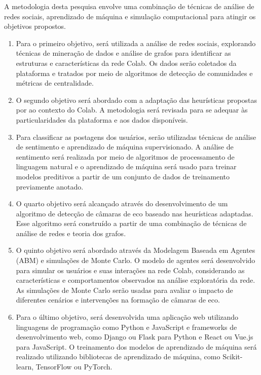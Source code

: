 A metodologia desta pesquisa envolve uma combinação de técnicas de análise de redes sociais, aprendizado de máquina e simulação computacional para atingir os objetivos propostos.

\begin{enumerate}
	\item Para o primeiro objetivo, será utilizada a análise de redes sociais, explorando técnicas de mineração de dados e análise de grafos para identificar as estruturas e características da rede Colab. Os dados serão coletados da plataforma e tratados por meio de algoritmos de detecção de comunidades e métricas de centralidade.
	\item O segundo objetivo será abordado com a adaptação das heurísticas propostas por  ao contexto do Colab. A metodologia será revisada para se adequar às particularidades da plataforma e aos dados disponíveis.
	\item Para classificar as postagens dos usuários, serão utilizadas técnicas de análise de sentimento e aprendizado de máquina supervisionado. A análise de sentimento será realizada por meio de algoritmos de processamento de linguagem natural e o aprendizado de máquina será usado para treinar modelos preditivos a partir de um conjunto de dados de treinamento previamente anotado.
	\item O quarto objetivo será alcançado através do desenvolvimento de um algoritmo de detecção de câmaras de eco baseado nas heurísticas adaptadas. Esse algoritmo será construído a partir de uma combinação de técnicas de análise de redes e teoria dos grafos.
	\item O quinto objetivo será abordado através da Modelagem Baseada em Agentes (ABM) e simulações de Monte Carlo. O modelo de agentes será desenvolvido para simular os usuários e suas interações na rede Colab, considerando as características e comportamentos observados na análise exploratória da rede. As simulações de Monte Carlo serão usadas para avaliar o impacto de diferentes cenários e intervenções na formação de câmaras de eco.
	\item Para o último objetivo, será desenvolvida uma aplicação web utilizando linguagens de programação como Python e JavaScript e frameworks de desenvolvimento web, como Django ou Flask para Python e React ou Vue.js para JavaScript. O treinamento dos modelos de aprendizado de máquina será realizado utilizando bibliotecas de aprendizado de máquina, como Scikit-learn, TensorFlow ou PyTorch.
\end{enumerate}

